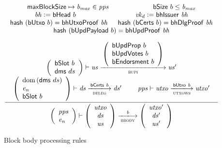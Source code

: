 \documentclass[11pt,a4paper]{article}
\DeclareMathOperator{\dom}{dom}
\newcommand{\var}[1]{\mathit{#1}}
\newcommand{\fun}[1]{\mathsf{#1}}
\newcommand{\pp}[1]{\mathsf{#1}}
\newcommand{\trans}[2]{\xlongrightarrow[\textsc{#1}]{#2}}
\newcommand{\leteq}{\ensuremath{\mathrel{\mathop:}=}}
\newcommand{\maxblocksize}{\pp{maxBlockSize}}
\newcommand{\bsizename}{bSize}
\newcommand{\bcertsname}{bCerts}
\newcommand{\bhissuername}{bhIssuer}
\newcommand{\bsize}[1]{\fun{\bsizename} ~ #1}
\newcommand{\bcerts}[1]{\fun{\bcertsname} ~ #1}
\newcommand{\bhissuer}[1]{\fun{\bhissuername} ~ #1}
\begin{document}
\begin{figure}[ht]
  \begin{equation*}
    \inference
    { \maxblocksize \mapsto \var{b_{max}} \in \var{pps} && \bsize{b} \leq \var{b_{max}} \\
      \var{bh} \leteq \bhead{b} & \var{vk_d} \leteq \bhissuer{\var{bh}} \\
      \fun{hash}~(\butxo{b}) = \fun{bhUtxoProof}~\var{bh} &
      \fun{hash}~(\bcerts{b}) = \fun{bhDlgProof}~\var{bh} \\
      \fun{hash}~(\bupdpayload{b}) = \fun{bhUpdProof}~\var{bh}\\~\\
      {\left(
          \begin{array}{l}
            \bslot{b} \\
            \fun{dms}~ ds
          \end{array}
        \right)}
      \vdash \var{us} \trans{bupi}{
        {\left(
            \begin{array}{l}
              \bupdprop{b} \\
              \bupdvotes{b} \\
              \bendorsment{b}
            \end{array}
          \right)}
      } \var{us'}
      \\
      {\left(
          \begin{array}{l}
            \dom{(\fun{dms}~ ds)} \\
            \var{e_n}\\
            \bslot{b}
          \end{array}
        \right)}
      \vdash \var{ds} \trans{deleg}{\bcerts{b}} \var{ds'} &
      \var{pps} \vdash \var{utxo} \trans{utxows}{\butxo{b}} \var{utxo'} \\
    }
    {
      \left(
        {\begin{array}{l}
           \var{pps} \\
           \var{e_n}
         \end{array}}
     \right)
     \vdash
     {
       \left(
         {\begin{array}{c}
            \var{utxo} \\
            \var{ds} \\
            \var{us}
          \end{array}}
      \right)
    }
    \trans{bbody}{\var{b}}
    {
      \left(
        {\begin{array}{c}
           \var{utxo'} \\
           \var{ds'} \\
           \var{us'}
         \end{array}}
     \right)
   }
 }
\end{equation*}
\caption{Block body processing rules}
\label{fig:rules:bbody}
\end{figure}
\end{document}
